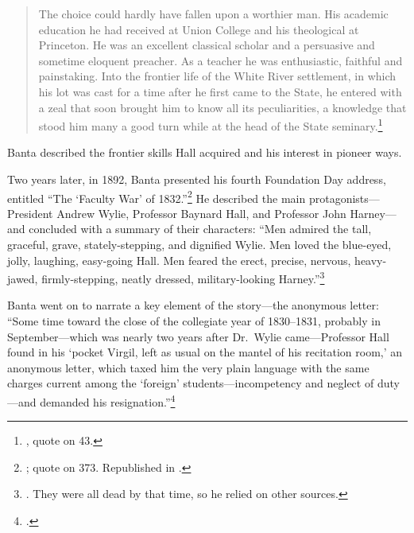 \documentclass[
  american,
  letterpaper,
]{scrreprt}
\begin{document}
\begin{quote}
The choice could hardly have fallen upon a worthier man. His academic
education he had received at Union College and his theological at
Princeton. He was an excellent classical scholar and a persuasive and
sometime eloquent preacher. As a teacher he was enthusiastic, faithful
and painstaking. Into the frontier life of the White River settlement,
in which his lot was cast for a time after he first came to the State,
he entered with a zeal that soon brought him to know all its
peculiarities, a knowledge that stood him many a good turn while at the
head of the State seminary.\footnote{,
  quote on 43.}
\end{quote}

Banta described the frontier skills Hall acquired and his interest in
pioneer ways.

Two years later, in 1892, Banta presented his fourth Foundation Day
address, entitled ``The `Faculty War' of 1832.''\footnote{; quote on 373. Republished in
  .} He described the main
protagonists---President Andrew Wylie, Professor Baynard Hall, and
Professor John Harney---and concluded with a summary of their
characters: ``Men admired the tall, graceful, grave, stately-stepping,
and dignified Wylie. Men loved the blue-eyed, jolly, laughing,
easy-going Hall. Men feared the erect, precise, nervous, heavy-jawed,
firmly-stepping, neatly dressed, military-looking Harney.''\footnote{. They were all dead by
  that time, so he relied on other sources.}

Banta went on to narrate a key element of the story---the anonymous
letter: ``Some time toward the close of the collegiate year of
1830--1831, probably in September---which was nearly two years after
Dr.~Wylie came---Professor Hall found in his `pocket Virgil, left as
usual on the mantel of his recitation room,' an anonymous letter, which
taxed him the very plain language with the same charges current among
the `foreign' students---incompetency and neglect of duty---and demanded
his resignation.''\footnote{.}
\end{document}
